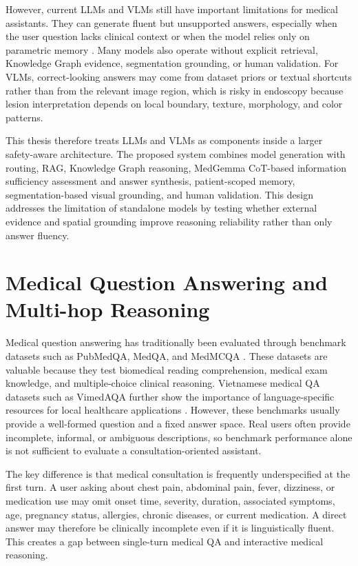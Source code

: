 However, current LLMs and VLMs still have important limitations for medical assistants. They can generate fluent but unsupported answers, especially when the user question lacks clinical context or when the model relies only on parametric memory \cite{llm_hallucination_survey}. Many models also operate without explicit retrieval, Knowledge Graph evidence, segmentation grounding, or human validation. For VLMs, correct-looking answers may come from dataset priors or textual shortcuts rather than from the relevant image region, which is risky in endoscopy because lesion interpretation depends on local boundary, texture, morphology, and color patterns.

This thesis therefore treats LLMs and VLMs as components inside a larger safety-aware architecture. The proposed system combines model generation with routing, RAG, Knowledge Graph reasoning, MedGemma CoT-based information sufficiency assessment and answer synthesis, patient-scoped memory, segmentation-based visual grounding, and human validation. This design addresses the limitation of standalone models by testing whether external evidence and spatial grounding improve reasoning reliability rather than only answer fluency.

\section{Medical Question Answering and Multi-hop Reasoning}

Medical question answering has traditionally been evaluated through benchmark datasets such as PubMedQA, MedQA, and MedMCQA \cite{pubmedqa,medqa,medmcqa}. These datasets are valuable because they test biomedical reading comprehension, medical exam knowledge, and multiple-choice clinical reasoning. Vietnamese medical QA datasets such as VimedAQA further show the importance of language-specific resources for local healthcare applications \cite{vimedaqa_dataset}. However, these benchmarks usually provide a well-formed question and a fixed answer space. Real users often provide incomplete, informal, or ambiguous descriptions, so benchmark performance alone is not sufficient to evaluate a consultation-oriented assistant.

The key difference is that medical consultation is frequently underspecified at the first turn. A user asking about chest pain, abdominal pain, fever, dizziness, or medication use may omit onset time, severity, duration, associated symptoms, age, pregnancy status, allergies, chronic diseases, or current medication. A direct answer may therefore be clinically incomplete even if it is linguistically fluent. This creates a gap between single-turn medical QA and interactive medical reasoning.

